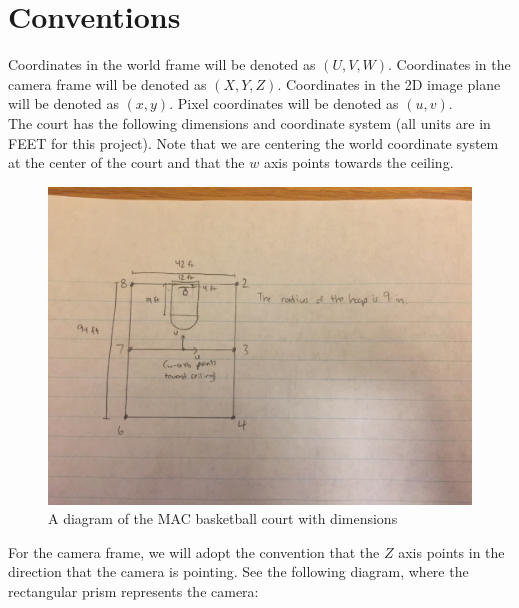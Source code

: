 \documentclass{article}
\begin{document}
\section{Conventions}
Coordinates in the world frame will be denoted as $(U, V, W)$. Coordinates in the camera frame will be denoted as $(X, Y, Z)$. Coordinates in the 2D image plane will be denoted as $(x, y)$. Pixel coordinates will be denoted as $(u, v)$. \\

The court has the following dimensions and coordinate system (all units are in FEET for this project). Note that we are centering the world coordinate system at the center of the court and that the $w$ axis points towards the ceiling.

\begin{figure}[H]
\includegraphics[scale=0.25]{Court_Diagram}
\centering
\caption{A diagram of the MAC basketball court with dimensions}
\end{figure}

For the camera frame, we will adopt the convention that the $Z$ axis points in the direction that the camera is pointing. See the following diagram, where the rectangular prism represents the camera:
\end{document}
